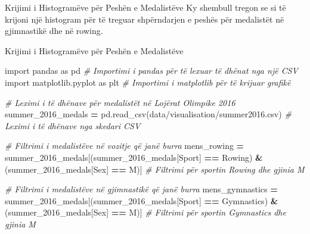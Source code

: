 \documentclass[
  ignorenonframetext,
]{beamer}
\newenvironment{Shaded}{\begin{snugshade}}{\end{snugshade}}
\newcommand{\CommentTok}[1]{\textcolor[rgb]{0.56,0.35,0.01}{\textit{#1}}}
\newcommand{\ImportTok}[1]{#1}
\newcommand{\NormalTok}[1]{#1}
\newcommand{\OperatorTok}[1]{\textcolor[rgb]{0.81,0.36,0.00}{\textbf{#1}}}
\newcommand{\StringTok}[1]{\textcolor[rgb]{0.31,0.60,0.02}{#1}}
\begin{document}
\begin{frame}{Krijimi i Histogramëve për Peshën e Medalistëve}
\protect\hypertarget{krijimi-i-histogramuxebve-puxebr-peshuxebn-e-medalistuxebve}{}
Ky shembull tregon se si të krijoni një histogram për të treguar
shpërndarjen e peshës për medalistët në gjimnastikë dhe në rowing.
\end{frame}

\begin{frame}[fragile]{Krijimi i Histogramëve për Peshën e Medalistëve}
\protect\hypertarget{krijimi-i-histogramuxebve-puxebr-peshuxebn-e-medalistuxebve-1}{}

\begin{Shaded}
\begin{Highlighting}[]
\ImportTok{import}\NormalTok{ pandas }\ImportTok{as}\NormalTok{ pd  }\CommentTok{\# Importimi i pandas për të lexuar të dhënat nga një CSV}
\ImportTok{import}\NormalTok{ matplotlib.pyplot }\ImportTok{as}\NormalTok{ plt  }\CommentTok{\# Importimi i matplotlib për të krijuar grafikë}

\CommentTok{\# Leximi i të dhënave për medalistët në Lojërat Olimpike 2016}
\NormalTok{summer\_2016\_medals }\OperatorTok{=}\NormalTok{ pd.read\_csv(}\StringTok{\textquotesingle{}data/visualisation/summer2016.csv\textquotesingle{}}\NormalTok{)  }\CommentTok{\# Leximi i të dhënave nga skedari CSV}

\CommentTok{\# Filtrimi i medalistëve në vozitje që janë burra}
\NormalTok{mens\_rowing }\OperatorTok{=}\NormalTok{ summer\_2016\_medals[(summer\_2016\_medals[}\StringTok{\textquotesingle{}Sport\textquotesingle{}}\NormalTok{] }\OperatorTok{==} \StringTok{\textquotesingle{}Rowing\textquotesingle{}}\NormalTok{) }\OperatorTok{\&}\NormalTok{ (summer\_2016\_medals[}\StringTok{\textquotesingle{}Sex\textquotesingle{}}\NormalTok{] }\OperatorTok{==} \StringTok{\textquotesingle{}M\textquotesingle{}}\NormalTok{)]  }\CommentTok{\# Filtrimi për sportin \textquotesingle{}Rowing\textquotesingle{} dhe gjinia \textquotesingle{}M\textquotesingle{}}

\CommentTok{\# Filtrimi i medalistëve në gjimnastikë që janë burra}
\NormalTok{mens\_gymnastics }\OperatorTok{=}\NormalTok{ summer\_2016\_medals[(summer\_2016\_medals[}\StringTok{\textquotesingle{}Sport\textquotesingle{}}\NormalTok{] }\OperatorTok{==} \StringTok{\textquotesingle{}Gymnastics\textquotesingle{}}\NormalTok{) }\OperatorTok{\&}\NormalTok{ (summer\_2016\_medals[}\StringTok{\textquotesingle{}Sex\textquotesingle{}}\NormalTok{] }\OperatorTok{==} \StringTok{\textquotesingle{}M\textquotesingle{}}\NormalTok{)]  }\CommentTok{\# Filtrimi për sportin \textquotesingle{}Gymnastics\textquotesingle{} dhe gjinia \textquotesingle{}M\textquotesingle{}}


\end{Highlighting}
\end{Shaded}
\end{frame}
\end{document}
